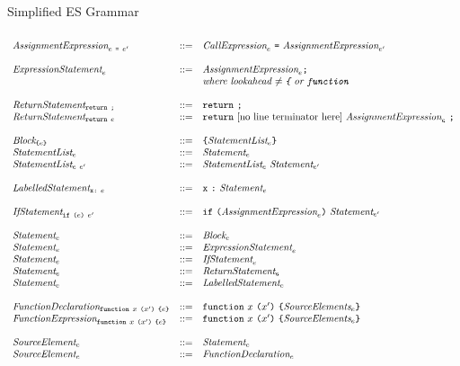 \documentclass[preprint,10pt]{sigplanconf}
\begin{document}
\begin{displayfigure*}{\label{fig:grammar}Simplified ES Grammar}
\[\begin{array}{lcl}
  \\
  \textit{AssignmentExpression}_{e~\texttt{=}~e'} &::=&
  \textit{CallExpression}_{e}~\texttt{=}~
  \textit{AssignmentExpression}_{e'}
  \\ \\
  \textit{ExpressionStatement}_{e} &::=&
  \textit{AssignmentExpression}_{e} \texttt{;}
  \\ 
  &&  \textit{where lookahead \( \not =
    \texttt{\{} \) or \( \texttt{function} \)}
  \\ \\
  \textit{ReturnStatement}_{\texttt{return}~\texttt{;}} &::=&
  \texttt{return}~\texttt{;}
  \\
  \textit{ReturnStatement}_{\texttt{return}~e} &::=&
  \texttt{return}~\textrm{[no line terminator
    here]}~\textit{AssignmentExpression}_{e}~\texttt{;}
  \\ \\
  \textit{Block}_{\texttt{\{}e\texttt{\}}} &::=&
  \texttt{\{} \textit{StatementList}_{e} \texttt{\}} 
  \\
  \textit{StatementList}_{e} &::=&
  \textit{Statement}_{e}
  \\
  \textit{StatementList}_{e~e'} &::=&
  \textit{StatementList}_{e}~
  \textit{Statement}_{e'}
  \\ \\
  \textit{LabelledStatement}_{\texttt{x}\texttt{:}~e} &::=&
  \texttt{x}~\texttt{:}~\textit{Statement}_{e}
  \\ \\
  \textit{IfStatement}_{\texttt{if}~\texttt{(}e\texttt{)}~e'} &::=&
  \texttt{if}~\texttt{(}\textit{AssignmentExpression}_{e}\texttt{)}~\textit{Statement}_{e'}
  \\ \\
  \textit{Statement}_{e} &::=& \textit{Block}_{e}
  \\
  \textit{Statement}_{e} &::=& \textit{ExpressionStatement}_{e}
  \\
  \textit{Statement}_{e} &::=& \textit{IfStatement}_{e}
  \\
  \textit{Statement}_{e} &::=& \textit{ReturnStatement}_{e}
  \\
  \textit{Statement}_{e} &::=& \textit{LabelledStatement}_{e}
  \\ \\
  \textit{FunctionDeclaration}_{\texttt{function}~x~\texttt{(}x'\texttt{)}~\texttt{\{}e\texttt{\}}} 
  &::=&
  \texttt{function}~x~\texttt{(}x'\texttt{)}~
  \texttt{\{}\textit{SourceElements}_{e}\texttt{\}}
  \\
  \textit{FunctionExpression}_{\texttt{function}~x~\texttt{(}x'\texttt{)}~\texttt{\{}e\texttt{\}}} 
  &::=&
  \texttt{function}~x~\texttt{(}x'\texttt{)}~
  \texttt{\{}\textit{SourceElements}_{e}\texttt{\}}
  \\ \\
  \textit{SourceElement}_{e} &::=& \textit{Statement}_{e} 
  \\
  \textit{SourceElement}_{e} &::=& \textit{FunctionDeclaration}_{e}
  \\ \\


\end{array}\]
\end{displayfigure*}
\end{document}
